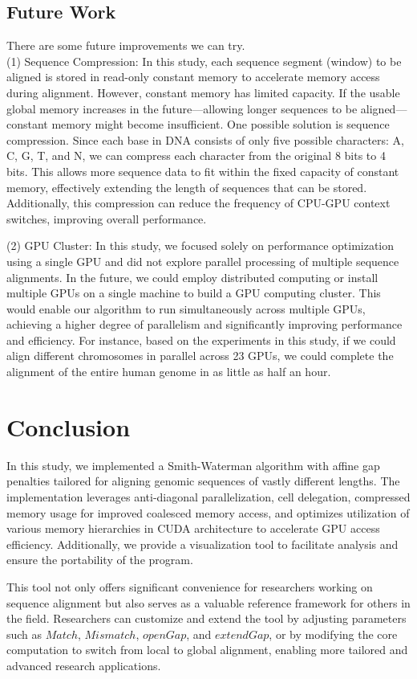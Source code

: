 \documentclass[PhD]{PHlab-thesis}
\begin{document}
\section{Future Work}
There are some future improvements we can try.\\
(1) Sequence Compression: In this study, each sequence segment (window) to be aligned is stored in read-only constant memory to accelerate memory access during alignment. However, constant memory has limited capacity. If the usable global memory increases in the future—allowing longer sequences to be aligned—constant memory might become insufficient. One possible solution is sequence compression. Since each base in DNA consists of only five possible characters: A, C, G, T, and N, we can compress each character from the original 8 bits to 4 bits. This allows more sequence data to fit within the fixed capacity of constant memory, effectively extending the length of sequences that can be stored. Additionally, this compression can reduce the frequency of CPU-GPU context switches, improving overall performance.

(2) GPU Cluster: In this study, we focused solely on performance optimization using a single GPU and did not explore parallel processing of multiple sequence alignments. In the future, we could employ distributed computing or install multiple GPUs on a single machine to build a GPU computing cluster. This would enable our algorithm to run simultaneously across multiple GPUs, achieving a higher degree of parallelism and significantly improving performance and efficiency. For instance, based on the experiments in this study, if we could align different chromosomes in parallel across 23 GPUs, we could complete the alignment of the entire human genome in as little as half an hour.

\chapter{Conclusion}
In this study, we implemented a Smith-Waterman algorithm with affine gap penalties tailored for aligning genomic sequences of vastly different lengths. The implementation leverages anti-diagonal parallelization, cell delegation, compressed memory usage for improved coalesced memory access, and optimizes utilization of various memory hierarchies in CUDA architecture to accelerate GPU access efficiency. Additionally, we provide a visualization tool to facilitate analysis and ensure the portability of the program.

This tool not only offers significant convenience for researchers working on sequence alignment but also serves as a valuable reference framework for others in the field. Researchers can customize and extend the tool by adjusting parameters such as $Match$, $Mismatch$, $openGap$, and $extendGap$, or by modifying the core computation to switch from local to global alignment, enabling more tailored and advanced research applications.



\newpage
{}
\printbibliography
\end{document}

